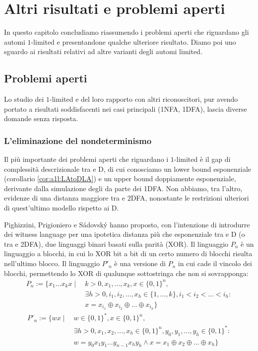 \chapter{Altri risultati e problemi aperti}\label{cha:prob}
In questo capitolo concludiamo riassumendo i problemi aperti che riguardano gli automi $1$-limited e presentandone qualche ulteriore risultato. Diamo poi uno sguardo ai risultati relativi ad altre varianti degli automi limited.



\section{Problemi aperti}
Lo studio dei $1$-limited e del loro rapporto con altri riconoscitori, pur avendo portato a risultati soddisfacenti nei casi principali (1NFA, 1DFA), lascia diverse domande senza risposta.


\subsection{L'eliminazione del nondeterminismo}
Il più importante dei problemi aperti che riguardano i $1$-limited è il gap di complessità descrizionale tra  e D, di cui conosciamo un lower bound esponenziale (corollario \ref{cor:a1l:LAtoDLA}) e un upper bound doppiamente esponenziale, derivante dalla simulazione degli  da parte dei 1DFA. Non abbiamo, tra l'altro, evidenze di una distanza maggiore tra  e 2DFA, nonostante le restrizioni ulteriori di quest'ultimo modello rispetto ai D.

Pighizzini, Prigioniero e Sádovský \cite{Pighizzini:22:limitedwitness} hanno proposto, con l'intenzione di introdurre dei witness language per una ipotetica distanza più che esponenziale tra  e D (o tra  e 2DFA), due linguaggi binari basati sulla parità (XOR). Il linguaggio $P_n$ è un linguaggio a blocchi, in cui lo XOR bit a bit di un certo numero di blocchi risulta nell'ultimo blocco. Il linguaggio $P'_n$ è una versione di $P_n$ in cui cade il vincolo dei blocchi, permettendo lo XOR di qualunque sottostringa che non si sovrapponga:
\begin{align*}
	P_n := \{  x_1\dots x_kx \mid ~ & k>0, x_1,\dots,x_k,x\in\{0,1\}^n,                                \\
	                                & \exists h>0,i_1,i_2,\dots,x_h\in\{1,\dots,k\},i_1<i_2<\dots<i_h: \\
	                                & x=x_{i_1}\oplus x_{i_2}\oplus\dots\oplus x_{i_h}\}
\end{align*}
\begin{align*}
	P'_n := \{  wx \mid ~ & w\in\{0,1\}^*,x\in\{0,1\}^n,                                                \\
	                      & \exists h>0,x_1,x_2,\dots,x_h\in\{0,1\}^n,y_0,y_1,\dots,y_h\in\{0,1\}^*:    \\
	                      & w=y_0x_1y_1\dots y_{n-1}x_hy_h \land x=x_1\oplus x_2\oplus\dots\oplus x_h\}
\end{align*}

